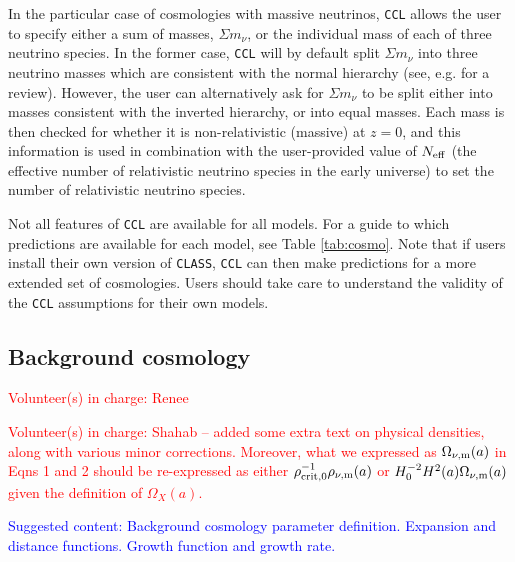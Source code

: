 \documentclass[\docopts]{\docclass}
\newcommand{\todo}[1]{\textcolor{magenta}{To do: #1}}
\newcommand{\vol}[1]{\textcolor{red}{Volunteer(s) in charge: #1}}
\newcommand{\cont}[1]{\textcolor{blue}{Suggested content: #1}}
\newcommand{\ccl}{{\tt CCL}\xspace}
\begin{document}
In the particular case of cosmologies with massive neutrinos, \ccl allows the user to specify either a sum of masses, $\Sigma m_\nu$, or the individual mass of each of three neutrino species. In the former case, \ccl will by default split $\Sigma m_\nu$ into three neutrino masses which are consistent with the normal hierarchy (see, e.g. \cite{Gerbino2017} for a review). However, the user can alternatively ask for $\Sigma m_\nu$ to be split either into masses consistent with the inverted hierarchy, or into equal masses. Each mass is then checked for whether it is non-relativistic (massive) at $z=0$, and this information is used in combination with the user-provided value of $N_{\rm eff}$ (the effective number of relativistic neutrino species in the early universe) to set the number of relativistic neutrino species.

Not all features of \ccl are available for all models. For a guide to which predictions are available for each model, see Table \ref{tab:cosmo}. Note that if users install their own version of {\tt CLASS}, {\tt CCL} can then make predictions for a more extended set of cosmologies. Users should take care to understand the validity of the {\tt CCL} assumptions for their own models.




\subsection{Background cosmology}
\vol{Renee}

\vol{Shahab -- added some extra text on physical densities, along with various minor corrections. Moreover, what we expressed as $\Omega_{\nu, {\rm m}}(a)$ in Eqns 1 and 2 should be re-expressed as either $\rho^{-1}_{\rm crit,0} \rho_{\nu, {\rm m}}(a)$ or $H_0^{-2} H^{2}(a)\Omega_{\nu, {\rm m}}(a)$ given the definition of $\Omega_X(a)$.}

\cont{Background cosmology parameter definition. Expansion and distance functions. Growth function and growth rate.}
\end{document}
